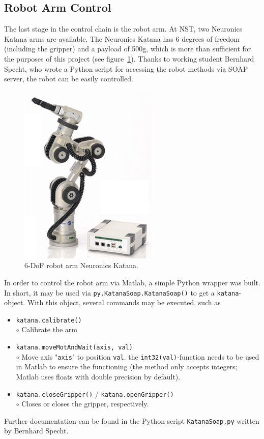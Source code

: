 \documentclass[a4paper,oneside, openright,12pt]{report}
\begin{document}
\subsection{Robot Arm Control}
The last stage in the control chain is the robot arm. At NST, two Neuronics Katana arms are available. The Neuronics Katana has 6 degrees of freedom (including the gripper) and a payload of 500g, which is more than sufficient for the purposes of this project (see figure~\ref{fig:katana}). Thanks to working student Bernhard Specht, who wrote a Python script for accessing the robot methods via SOAP server, the robot can be easily controlled. 
\begin{figure}[htpb!]
	\centering
	\includegraphics[width=0.3\linewidth]{./gfx/katana.jpg}
	\caption{6-DoF robot arm Neuronics Katana.}
	\label{fig:katana}
\end{figure}
In order to control the robot arm via Matlab, a simple Python wrapper was built. In short, it may be used via \texttt{py.KatanaSoap.KatanaSoap()} to get a \texttt{katana}-object. With this object, several commands may be executed, such as
\begin{itemize}
	\item \texttt{katana.calibrate()}\\
	$\circ$ Calibrate the arm
	\item \texttt{katana.moveMotAndWait(axis, val)}\\
	$\circ$ Move axis "\texttt{axis}" to position \texttt{val}. the \texttt{int32(val)}-function needs to be used in Matlab to ensure the functioning (the method only accepts integers; Matlab uses floats with double precision by default).
	\item \texttt{katana.closeGripper()} / \texttt{katana.openGripper()}\\
	$\circ$ Closes or closes the gripper, respectively. 
\end{itemize}
Further documentation can be found in the Python script \texttt{KatanaSoap.py} written by Bernhard Specht.\\\\
\end{document}
